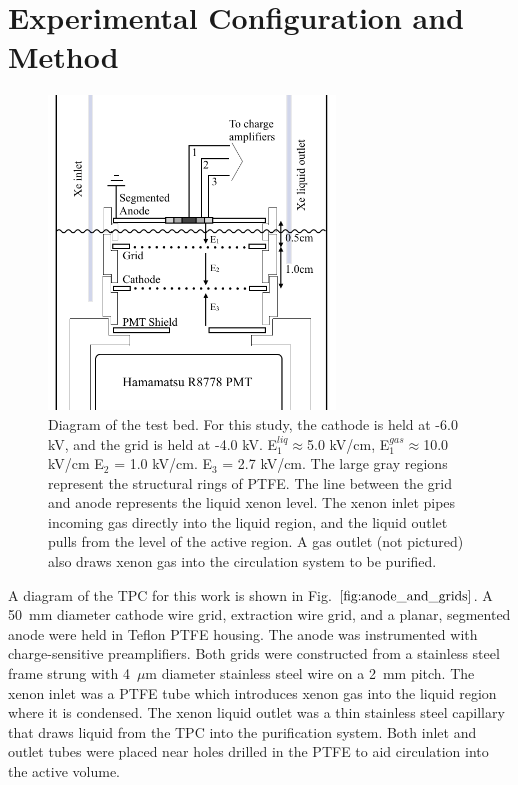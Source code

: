 \section{Experimental Configuration and Method}
\begin{figure}[ht]
    \centering
    \includegraphics[width=3.0in]{figures/radon/internals.png}
    \caption{Diagram of the test bed. For this study, the cathode is held at -6.0 kV, and the grid is held at -4.0 kV. E$_{1}^{liq} \approx $5.0 kV/cm, E$_{1}^{gas} \approx $10.0 kV/cm E$_{2}$ = 1.0 kV/cm. E$_{3}$ = 2.7 kV/cm. The large gray regions represent the structural rings of PTFE. The line between the grid and anode represents the liquid xenon level. The xenon inlet pipes incoming gas directly into the liquid region, and the liquid outlet pulls from the level of the active region. A gas outlet (not pictured) also draws xenon gas into the circulation system to be purified.}
    \label{fig:anode_and_grids}
\end{figure}

A diagram of the TPC for this work is shown in Fig. $\ref{fig:anode_and_grids}$. A 50~mm diameter cathode wire grid, extraction wire grid, and a planar, segmented anode were held in Teflon PTFE housing. The anode was instrumented with charge-sensitive preamplifiers. Both grids were constructed from a stainless steel frame strung with 4~$\mu$m diameter stainless steel wire on a 2~mm pitch. The xenon inlet was a PTFE tube which introduces xenon gas  into the liquid region where it is condensed. The xenon liquid outlet was a thin stainless steel capillary that draws liquid from the TPC into the purification system. Both inlet and outlet tubes were placed near holes drilled in the PTFE to aid circulation into the active volume.

